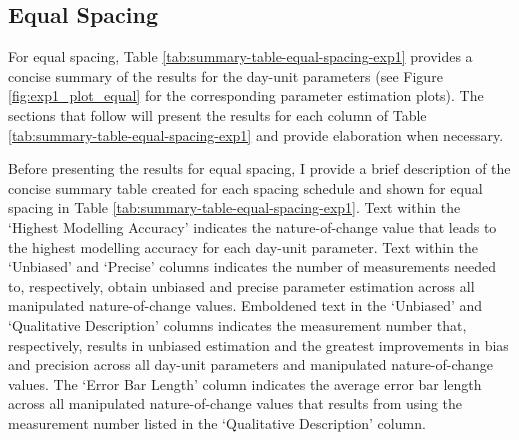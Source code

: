 \documentclass[
12pt, %
twoside,
english]{guelphthesis}
\theoremstyle{definition}
\theoremstyle{definition}
\theoremstyle{definition}
\theoremstyle{definition}
\theoremstyle{remark}
\begin{document}
\hypertarget{concise-tab}{%
\subsection{Equal Spacing}\label{concise-tab}}

For equal spacing, Table \ref{tab:summary-table-equal-spacing-exp1} provides a concise summary of the results for the day-unit parameters (see Figure \ref{fig:exp1_plot_equal} for the corresponding parameter estimation plots). The sections that follow will present the results for each column of Table \ref{tab:summary-table-equal-spacing-exp1} and provide elaboration when necessary.

Before presenting the results for equal spacing, I provide a brief description of the concise summary table created for each spacing schedule and shown for equal spacing in Table \ref{tab:summary-table-equal-spacing-exp1}. Text within the `Highest Modelling Accuracy' indicates the nature-of-change value that leads to the highest modelling accuracy for each day-unit parameter. Text within the `Unbiased' and `Precise' columns indicates the number of measurements needed to, respectively, obtain unbiased and precise parameter estimation across all manipulated nature-of-change values. Emboldened text in the `Unbiased' and `Qualitative Description' columns indicates the measurement number that, respectively, results in unbiased estimation and the greatest improvements in bias and precision across all day-unit parameters and manipulated nature-of-change values. The `Error Bar Length' column indicates the average error bar length across all manipulated nature-of-change values that results from using the measurement number listed in the `Qualitative Description' column.
\end{document}
